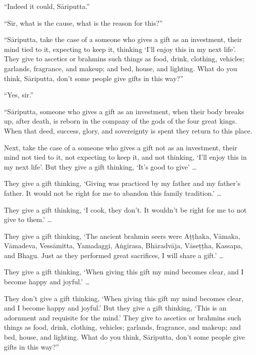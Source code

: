 \documentclass[12pt,openany]{book}%
\begin{document}
“Indeed it could, \textsanskrit{Sāriputta}.” 

“Sir, what is the cause, what is the reason for this?” 

“\textsanskrit{Sāriputta}, take the case of a someone who gives a gift as an investment, their mind tied to it, expecting to keep it, thinking ‘I’ll enjoy this in my next life’. They give to ascetics or brahmins such things as food, drink, clothing, vehicles; garlands, fragrance, and makeup; and bed, house, and lighting. What do you think, \textsanskrit{Sāriputta}, don’t some people give gifts in this way?” 

“Yes, sir.” 

“\textsanskrit{Sāriputta}, someone who gives a gift as an investment, when their body breaks up, after death, is reborn in the company of the gods of the four great kings. When that deed, success, glory, and sovereignty is spent they return to this place. 

Next, take the case of a someone who gives a gift not as an investment, their mind not tied to it, not expecting to keep it, and not thinking, ‘I’ll enjoy this in my next life’. But they give a gift thinking, ‘It’s good to give’ … 

They give a gift thinking, ‘Giving was practiced by my father and my father’s father. It would not be right for me to abandon this family tradition.’ … 

They give a gift thinking, ‘I cook, they don’t. It wouldn’t be right for me to not give to them.’ … 

They give a gift thinking, ‘The ancient brahmin seers were \textsanskrit{Aṭṭhaka}, \textsanskrit{Vāmaka}, \textsanskrit{Vāmadeva}, \textsanskrit{Vessāmitta}, Yamadaggi, \textsanskrit{Aṅgīrasa}, \textsanskrit{Bhāradvāja}, \textsanskrit{Vāseṭṭha}, Kassapa, and Bhagu. Just as they performed great sacrifices, I will share a gift.’ … 

They give a gift thinking, ‘When giving this gift my mind becomes clear, and I become happy and joyful.’ … 

They don’t give a gift thinking, ‘When giving this gift my mind becomes clear, and I become happy and joyful.’ But they give a gift thinking, ‘This is an adornment and requisite for the mind.’ They give to ascetics or brahmins such things as food, drink, clothing, vehicles; garlands, fragrance, and makeup; and bed, house, and lighting. What do you think, \textsanskrit{Sāriputta}, don’t some people give gifts in this way?” 
\end{document}
